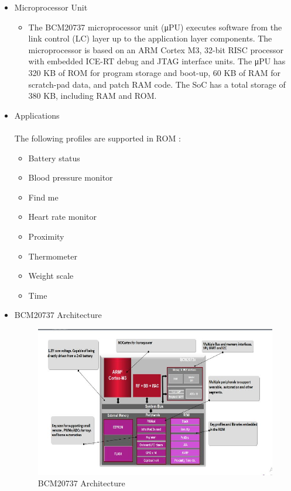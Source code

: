 \documentclass[11pt,a4paper]{article}
\begin{document}
\begin{itemize}
\item Microprocessor Unit
\begin{itemize}
\item The BCM20737 microprocessor unit (μPU) executes software from the link control (LC) layer up to the
application layer components. The microprocessor is based on an ARM Cortex M3, 32-bit RISC processor with embedded ICE-RT debug and JTAG interface units. The μPU has 320 KB of ROM for program storage and
boot-up, 60 KB of RAM for scratch-pad data, and patch RAM code. The SoC has a total storage of 380 KB,
including RAM and ROM.
\end{itemize}

\item Applications
\\ \\
The following profiles are supported in ROM :
\begin{itemize}
\item  Battery status
\item Blood pressure monitor
\item Find me
\item Heart rate monitor
\item Proximity
\item Thermometer
\item Weight scale
\item Time
\end{itemize}

\newpage
\item BCM20737 Architecture
\begin{figure}[h]
    \centering
	\includegraphics[scale=0.8]{architecture.JPG}
	\caption {BCM20737 Architecture}
	\end{figure}
	

\end{itemize}
\end{document}
